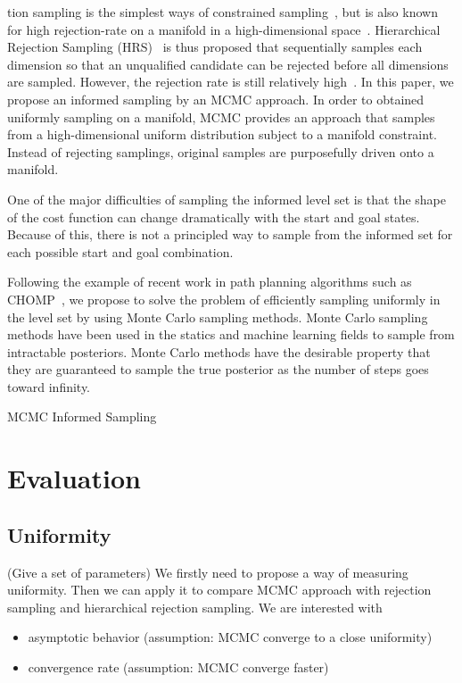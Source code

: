 \documentclass[letterpaper, 10 pt, conference]{ieeeconf}  %
\begin{document}
{tion sampling is the simplest ways of constrained sampling~\cite{CRCW04}, but is also known for high rejection-rate on a manifold in a high-dimensional space~\cite{KTC16}.
Hierarchical Rejection Sampling (HRS)~\cite{KTC16} is thus proposed that sequentially samples each dimension so that an unqualified candidate can be rejected before all dimensions are sampled. 
However, the rejection rate is still relatively high~\cite{KTC16}.
In this paper, we propose an informed sampling by an MCMC approach.
In order to obtained uniformly sampling on a manifold, MCMC provides an approach that samples from a high-dimensional uniform distribution subject to a manifold constraint.
Instead of rejecting samplings, original samples are purposefully driven onto a manifold.

One of the major difficulties of sampling the informed level set is that the shape of the cost function can change dramatically with the start and goal states. Because of this, there is not a principled way to sample from the informed set for each possible start and goal combination.  

Following the example of recent work in path planning algorithms such as CHOMP~\cite{RZBS09}, we propose to solve the problem of efficiently sampling uniformly in the level set by using Monte Carlo sampling methods. Monte Carlo sampling methods have been used in the statics and machine learning fields to sample from intractable posteriors. Monte Carlo methods have the desirable property that they are guaranteed to sample the true posterior as the number of steps goes toward infinity.


\begin{algorithm}
	\begin{algorithmic}[1]
		\STATE
   	\end{algorithmic}
	\caption{MCMC Informed Sampling}
	\label{alg:mcmc_informed_sampling}
\end{algorithm}
}

\section{Evaluation}
\label{sec:eval}

\subsection{Uniformity}

(Give a set of parameters)
We firstly need to propose a way of measuring uniformity.
Then we can apply it to compare MCMC approach with rejection sampling and hierarchical rejection sampling.
We are interested with
\begin{itemize}
	\item asymptotic behavior (assumption: MCMC converge to a close uniformity)
	\item convergence rate (assumption: MCMC converge faster)
\end{itemize}
\end{document}
